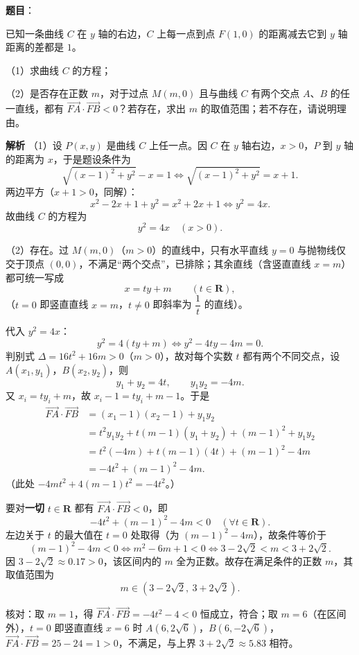\begin{answer}

\textbf{题目}：

已知一条曲线 $C$ 在 $y$ 轴的右边，$C$ 上每一点到点 $F(1,0)$ 的距离减去它到 $y$ 轴距离的差都是 $1$。

（1）求曲线 $C$ 的方程；

（2）是否存在正数 $m$，对于过点 $M(m,0)$ 且与曲线 $C$ 有两个交点 $A$、$B$ 的任一直线，都有 $\overrightarrow{FA}\cdot\overrightarrow{FB}<0$？若存在，求出 $m$ 的取值范围；若不存在，请说明理由。

\textbf{解析}
（1）设 $P(x,y)$ 是曲线 $C$ 上任一点。因 $C$ 在 $y$ 轴右边，$x>0$，$P$ 到 $y$ 轴的距离为 $x$，于是题设条件为
\nopagebreak[4]
\[\sqrt{(x-1)^2+y^2}-x=1\iff\sqrt{(x-1)^2+y^2}=x+1.\]
两边平方（$x+1>0$，同解）：
\nopagebreak[4]
\[x^2-2x+1+y^2=x^2+2x+1\iff y^2=4x.\]
故曲线 $C$ 的方程为
\nopagebreak[4]
\[y^2=4x\quad(x>0).\]

（2）存在。过 $M(m,0)$（$m>0$）的直线中，只有水平直线 $y=0$ 与抛物线仅交于顶点 $(0,0)$，不满足“两个交点”，已排除；其余直线（含竖直直线 $x=m$）都可统一写成
\nopagebreak[4]
\[x=ty+m\qquad(t\in\mathbf R),\]
（$t=0$ 即竖直直线 $x=m$，$t\ne0$ 即斜率为 $\dfrac1t$ 的直线）。

代入 $y^2=4x$：
\nopagebreak[4]
\[y^2=4(ty+m)\iff y^2-4ty-4m=0.\]
判别式 $\Delta=16t^2+16m>0$（$m>0$），故对每个实数 $t$ 都有两个不同交点，设 $A(x_1,y_1)$，$B(x_2,y_2)$，则
\nopagebreak[4]
\[y_1+y_2=4t,\qquad y_1y_2=-4m.\]
又 $x_i=ty_i+m$，故 $x_i-1=t y_i+m-1$。于是
\nopagebreak[4]
\[\begin{aligned}
\overrightarrow{FA}\cdot\overrightarrow{FB}&=(x_1-1)(x_2-1)+y_1y_2\\
&=t^2y_1y_2+t(m-1)(y_1+y_2)+(m-1)^2+y_1y_2\\
&=t^2(-4m)+t(m-1)(4t)+(m-1)^2-4m\\
&=-4t^2+(m-1)^2-4m.
\end{aligned}\]
（此处 $-4mt^2+4(m-1)t^2=-4t^2$。）

要对\textbf{一切} $t\in\mathbf R$ 都有 $\overrightarrow{FA}\cdot\overrightarrow{FB}<0$，即
\nopagebreak[4]
\[-4t^2+(m-1)^2-4m<0\quad(\forall t\in\mathbf R).\]
左边关于 $t$ 的最大值在 $t=0$ 处取得（为 $(m-1)^2-4m$），故条件等价于
\nopagebreak[4]
\[(m-1)^2-4m<0\iff m^2-6m+1<0\iff 3-2\sqrt2<m<3+2\sqrt2.\]
因 $3-2\sqrt2\approx0.17>0$，该区间内的 $m$ 全为正数。故存在满足条件的正数 $m$，其取值范围为
\nopagebreak[4]
\[m\in\left(3-2\sqrt2,\ 3+2\sqrt2\right).\]

核对：取 $m=1$，得 $\overrightarrow{FA}\cdot\overrightarrow{FB}=-4t^2-4<0$ 恒成立，符合；取 $m=6$（在区间外），$t=0$ 即竖直直线 $x=6$ 时 $A\left(6,2\sqrt6\right)$，$B\left(6,-2\sqrt6\right)$，$\overrightarrow{FA}\cdot\overrightarrow{FB}=25-24=1>0$，不满足，与上界 $3+2\sqrt2\approx5.83$ 相符。


\end{answer}
